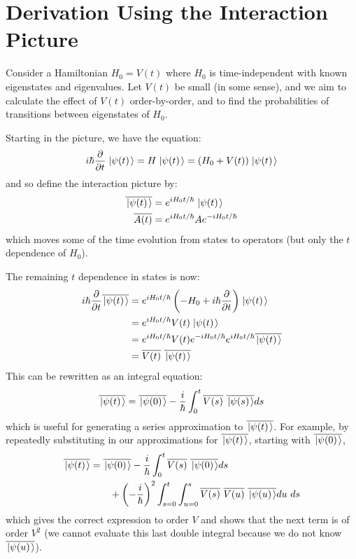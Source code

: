 \documentclass[../Main.tex]{subfiles}
\begin{document}
\section{Derivation Using the Interaction Picture}
Consider a Hamiltonian $H_0 = V(t)$ where $H_0$ is time-independent with known eigenstates and eigenvalues. Let $V(t)$ be small (in some sense), and we aim to calculate the effect of $V(t)$ order-by-order, and to find the probabilities of transitions between eigenstates of $H_0$.

Starting in the \schr picture, we have the \schr equation:
\begin{equation*}
    i\hbar \frac{\partial}{\partial t} \left.\left|\psi(t)\right.\right\rangle = H\left.\left|\psi(t)\right.\right\rangle = (H_0 + V(t)) \left.\left|\psi(t)\right.\right\rangle
\end{equation*}
and so define the interaction picture by:
\begin{align*}
    \overline{\left.\left|\psi(t)\right.\right\rangle} &= e^{iH_0 t / \hbar} \left.\left|\psi(t)\right.\right\rangle \\
    \overline{A(t)} &= e^{iH_0 t / \hbar} A e^{-iH_0 t / \hbar}
\end{align*}
which moves some of the time evolution from states to operators (but only the $t$ dependence of $H_0$).

The remaining $t$ dependence in states is now:
\begin{align*}
    i\hbar \frac{\partial}{\partial t} \overline{\left.\left|\psi(t)\right.\right\rangle} &= e^{iH_0 t / \hbar} \left(-H_0 + i\hbar \frac{\partial }{\partial t}\right) \left.\left|\psi(t)\right.\right\rangle \\
    &= e^{iH_0 t / \hbar} V(t) \left.\left|\psi(t)\right.\right\rangle \\
    &= e^{iH_0 t / \hbar} V(t) e^{-iH_0 t / \hbar}e^{i H_0 t / \hbar} \overline{\left.\left|\psi(t)\right.\right\rangle} \\
    &= \overline{V(t)}~\overline{\left.\left|\psi(t)\right.\right\rangle}
\end{align*}
This can be rewritten as an integral equation:
\begin{equation*}
    \overline{\left.\left|\psi(t)\right.\right\rangle} = \overline{\left.\left|\psi(0)\right.\right\rangle} -\frac{i}{\hbar} \int_{0}^{t} \overline{V(s)}~\overline{\left.\left|\psi(s)\right.\right\rangle} ds 
\end{equation*}
which is useful for generating a series approximation to $\overline{\left.\left|\psi(t)\right.\right\rangle}$. For example, by repeatedly substituting in our approximations for $\overline{\left.\left|\psi(t)\right.\right\rangle}$, starting with $\overline{\left.\left|\psi(0)\right.\right\rangle}$, 
\begin{align*}
    \overline{\left.\left|\psi(t)\right.\right\rangle} &= \overline{\left.\left|\psi(0)\right.\right\rangle} - \frac{i}{\hbar} \int_{0}^{t} \overline{V(s)}~\overline{\left.\left|\psi(0)\right.\right\rangle} ds \\
    &\qquad+ \left(-\frac i \hbar\right)^2 \int_{s = 0}^{t} \int_{u = 0}^{s} \overline{V(s)}~\overline{V(u)}~\overline{\left.\left|\psi(u)\right.\right\rangle} du~ds
\end{align*}
which gives the correct expression to order $V$ and shows that the next term is of order $V^2$ (we cannot evaluate this last double integral because we do not know $\overline{\left.\left|\psi(u)\right.\right\rangle}$).
\end{document}
